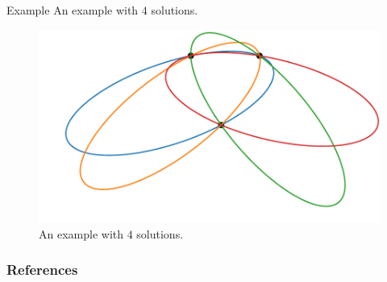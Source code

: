 \documentclass{beamer}
\begin{document}
\begin{frame}{Example}
	An example with $4$ solutions.
	\begin{figure}
		\centering
		
		\includegraphics[scale=.6]{e3psol012}
		\caption{An example with $4$ solutions.}
	\end{figure}
\end{frame}

\begin{frame}[allowframebreaks]
	\frametitle{References}
	
	
\end{frame}
	
\end{document}
